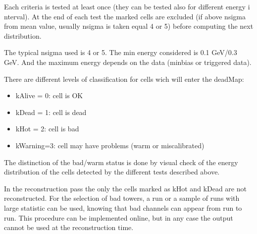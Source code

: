 Each criteria is tested at least once (they can be tested also for different energy i nterval). At the end of each test the marked cells are excluded (if above nsigma from mean value, usually nsigma is taken equal 4 or 5) before computing the next distribution. 

The typical nsigma used is 4 or 5.
The min energy considered is 0.1 GeV/0.3 GeV.  And the maximum energy depends on the data (minbias or triggered data). 


There are different levels of classification for  cells wich will enter the deadMap:
\begin{itemize}
\item kAlive = 0: cell is OK
\item kDead = 1: cell is dead 
\item kHot = 2: cell is bad
\item kWarning=3: cell may have problems (warm or miscalibrated)
\end{itemize}

The distinction of the bad/warm status is done by visual check of the energy distribution of the cells detected by the different tests described above.

In the reconstruction pass the only the cells marked as kHot and kDead are not reconstructed. 
For the selection of bad towers, a run or a sample of runs with large statistic can be used, knowing that bad channels can appear from run to run. This procedure can be implemented online, but in any case the output cannot be used at the reconstruction time.



